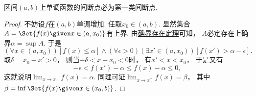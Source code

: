 \begin{example}\label{example:连续函数的运算.开区间上的单调函数的间断点必为第一类间断点}
区间\((a,b)\)上单调函数的间断点必为第一类间断点.
\begin{proof}
不妨设\(f\)在\((a,b)\)单调增加.
任取\(x_0\in(a,b)\).
显然集合\(A=\Set{ f(x) \given x\in(a,x_0) }\)有上界.
由\hyperref[theorem:实数.确界原理]{确界存在定理}可知，
\(A\)必定存在上确界\(\alpha=\sup A\).
于是\begin{equation*}
	(\forall x\in(a,x_0))
	[f(x)\leq\alpha]
	\land
	(\forall\epsilon>0)
	(\exists x'\in(a,x_0))
	[f(x')>\alpha-\epsilon].
\end{equation*}
取\(\delta=x_0-x'>0\)，
则当\(-\delta<x-x_0<0\)时，
有\(x'<x<x_0\)，
于是又有\begin{equation*}
	-\epsilon
	< f(x') - \alpha
	\leq f(x) - \alpha
	\leq 0,
\end{equation*}
这就说明\(\lim_{x \to x_0^-} f(x) = \alpha\).
同理可证\(\lim_{x \to x_0^+} f(x) = \beta\)，
其中\(\beta=\inf\Set{ f(x) \given x\in(x_0,b) }\).
\end{proof}
\end{example}

